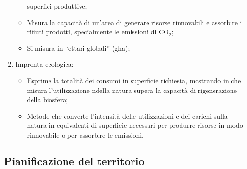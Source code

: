 \documentclass{article}
\begin{document}
\begin{enumerate}
\begin{itemize}
                superfici produttive;
            \item Misura la capacità di un'area di generare risorse rinnovabili e assorbire i
                rifiuti prodotti, specialmente le emissioni di CO$_2$;
            \item Si misura in ``ettari globali'' (gha);
        \end{itemize}
    \item Impronta ecologica:
        \begin{itemize}
            \item Esprime la totalità dei consumi in superficie richiesta, mostrando in che
                misura l'utilizzazione ndella natura supera la capacità di rigenerazione della
                biosfera;
            \item Metodo che converte l'intensità delle utilizzazioni e dei carichi sulla natura
                in equivalenti di superficie necessari per produrre risorse in modo rinnovabile
                o per assorbire le emissioni.
        \end{itemize}
\end{enumerate}

\subsection{Pianificazione del territorio}
\end{document}
